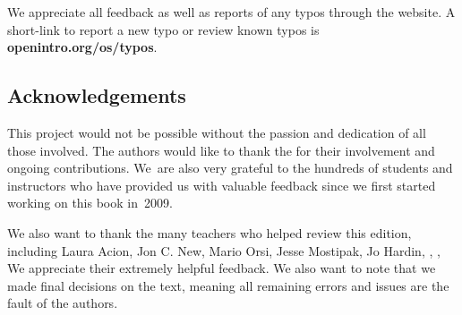We appreciate all feedback as well as reports of any
typos through the website.
A short-link to report a new typo or review known typos is
    {\color{black}\textbf{openintro.org/os/typos}}.



\subsection*{Acknowledgements}

This project would not be possible without the passion
and dedication of all those involved.
The authors would like to thank the
for their involvement and ongoing contributions.
We~are also very grateful to the hundreds of students
and instructors who have provided us with valuable feedback
since we first started working on this book in~2009.

We also want to thank the many teachers who helped review
this edition, including
Laura Acion,
Jon C. New,
Mario Orsi,
Jesse Mostipak,
Jo Hardin,
,
,
We appreciate their extremely helpful feedback.
We also want to note that we made final decisions on the text,
meaning all remaining errors and issues are the fault of the
authors.
